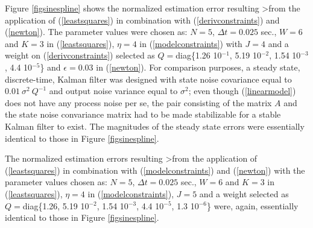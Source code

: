 Figure \ref{figsinespline} shows the normalized estimation error resulting
>from the application of (\ref{leastsquares})  in combination with
(\ref{derivconstraints})
and (\ref{newton}).   The parameter values were chosen as: $N=5$,
 $\Delta t = 0.025$ sec., $W=6$ and $K=3$  in (\ref{leastsquares}), 
$\eta = 4$ in (\ref{modelconstraints}) with $J=4$ and
a weight on (\ref{derivconstraints}) selected as
$Q =$diag\{1.26 10$^{-1}$, 5.19 10$^{-2}$, 1.54 10$^{-3}$, 4.4 10$^{-5}$\}
and $\epsilon = 0.03$ in (\ref{newton}).   
For comparison purposes,
a steady state, discrete-time, Kalman filter was designed with 
state noise covariance equal to 
$0.01 \ \sigma^2 \ Q^{-1}$ and output noise variance equal to $\sigma^2$; even
though (\ref{linearmodel}) does not have any process noise per se, the pair
consisting of the matrix $A$ and the state noise convariance matrix
had to be made stabilizable
for a stable Kalman filter to exist.
The magnitudes of the steady state errors were essentially identical to those in 
Figure \ref{figsinespline}.




The normalized estimation errors resulting
>from the application of (\ref{leastsquares}) in combination with
(\ref{modelconstraints})
and (\ref{newton}) 
with  the parameter values chosen as: $N=5$, 
$\Delta t = 0.025$
sec., $W=6$ and $K=3$  in (\ref{leastsquares}), $\eta = 4$ in
(\ref{modelconstraints}), 
$J=5$ and a weight selected as
$ Q =$diag\{1.26, 5.19 10$^{-2}$, 1.54 10$^{-3}$, 4.4 10$^{-5}$, 1.3 10$^{-6}$\} were, again, essentially identical to those in 
Figure \ref{figsinespline}.



